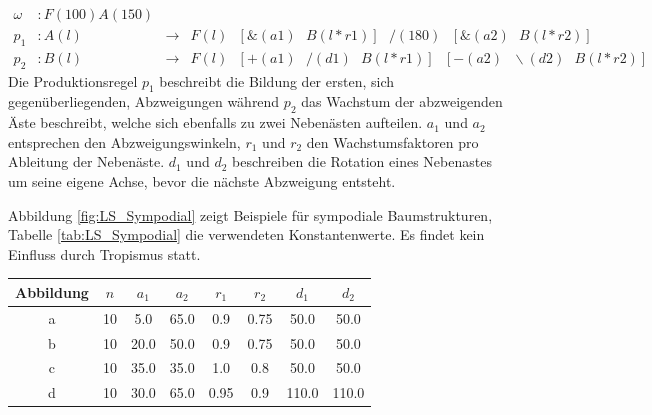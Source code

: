 \begin{equation}
\begin{array}{llll}
\omega & : F(100)A(150) \\
p_1 & : A(l) &\rightarrow& F(l)\text{ }[\&(a1)\text{ }B(l*r1)]\text{ }/(180)\text{ }[\&(a2)\text{ }B(l*r2)] \\
p_2 &  : B(l) &\rightarrow& F(l)\text{ }[+(a1)\text{ }/(d1)\text{ }B(l*r1)]\text{ }[-(a2)\text{ }\backslash(d2)\text{ }B(l*r2)]
\end{array}
\label{eq:ProdSympodial}
\end{equation} 
\cite[S.59]{ABOP:04}
Die Produktionsregel $p_1$ beschreibt die Bildung der ersten, sich gegenüberliegenden, Abzweigungen während $p_2$ das Wachstum der abzweigenden Äste beschreibt, welche sich ebenfalls zu zwei Nebenästen aufteilen. $a_1$ und $a_2$ entsprechen den Abzweigungswinkeln, $r_1$ und $r_2$ den Wachstumsfaktoren pro Ableitung der Nebenäste. $d_1$ und $d_2$ beschreiben die Rotation eines Nebenastes um seine eigene Achse, bevor die nächste Abzweigung entsteht.

Abbildung \ref{fig:LS_Sympodial} zeigt Beispiele für sympodiale Baumstrukturen, Tabelle \ref{tab:LS_Sympodial} die verwendeten Konstantenwerte. Es findet kein Einfluss durch Tropismus statt.

\begin{center}
	\begin{tabulary}{\textwidth}{|C|C|C|C|C|C|C|C|}
		\hline 
		Abbildung & $n$ & $a_1$ & $a_2$ & $r_1$ & $r_2$ & $d_1$ & $d_2$ \\ 
		\hline 
		a & 10 & 5.0 & 65.0 & 0.9 & 0.75 & 50.0 & 50.0 \\ 
		\hline 
		b & 10 & 20.0 & 50.0 & 0.9 & 0.75 & 50.0 & 50.0 \\ 
		\hline 
		c & 10 & 35.0 & 35.0 & 1.0 & 0.8 & 50.0 & 50.0 \\ 
		\hline 
		d & 10 & 30.0 & 65.0 & 0.95 & 0.9 & 110.0 & 110.0 \\ 
		\hline 
	\end{tabulary} 
	\label{tab:LS_Sympodial}
\end{center}

